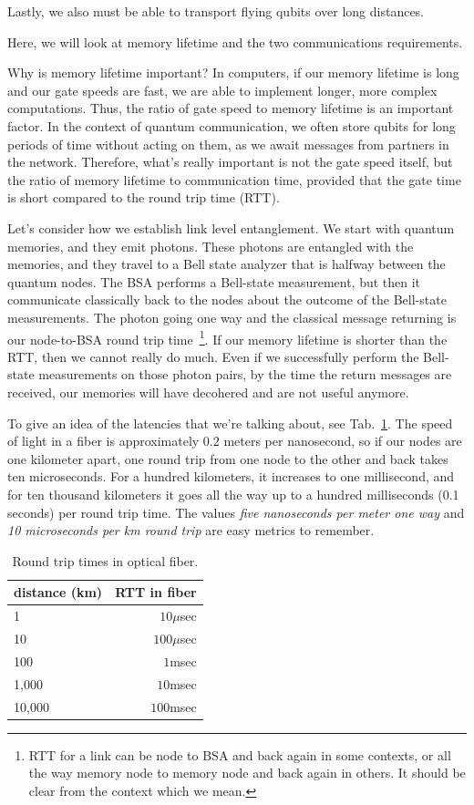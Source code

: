Lastly, we also must be able to transport flying qubits over long distances.

Here, we will look at memory lifetime and the two communications requirements.

Why is memory lifetime important? In computers, if our memory lifetime is long and our gate speeds are fast, we are able to implement longer, more complex computations.  Thus, the ratio of gate speed to memory lifetime is an important factor. In the context of quantum communication, we often store qubits for long periods of time without acting on them, as we await messages from partners in the network.  Therefore, what's really important is not the gate speed itself, but the ratio of memory lifetime to communication time, 
provided that the gate time is short compared to the round trip time (RTT). 

Let's consider how we establish link level entanglement. We start with quantum memories, and they emit photons. These photons are entangled with the memories, and they travel to a Bell state analyzer that is halfway between the quantum nodes. The BSA performs a Bell-state measurement, but then it communicate classically back to the nodes about the outcome of the Bell-state measurements. The photon going one way and the classical message returning is our node-to-BSA round trip time~\footnote{RTT for a link can be node to BSA and back again in some contexts, or all the way memory node to memory node and back again in others. It should be clear from the context which we mean.}. If our memory lifetime is shorter than the RTT, then we cannot really do much. Even if we successfully perform the Bell-state measurements on those photon pairs, by the time the return messages are received, our memories will have decohered and are not useful anymore.

To give an idea of the latencies that we're talking about, see Tab.~\ref{tab:rtt}. The speed of light in a fiber is approximately $0.2$ meters per nanosecond,
so if our nodes are one kilometer apart, one round trip from one node to the other and back takes ten microseconds. For a hundred kilometers, it increases to one millisecond, and for ten thousand kilometers it goes all the way up to a hundred milliseconds (0.1 seconds) per round trip time.  The values \emph{five nanoseconds per meter one way} and \emph{10 microseconds per km round trip} are easy metrics to remember.

\begin{table}
\centering
\begin{tabular}{l|r}
distance (km)  & RTT in fiber \\\hline
1     & $10\mu$sec \\
10    & $100\mu$sec \\
100   & $1$msec \\
1,000 & $10$msec \\
10,000 & $100$msec
\end{tabular}
\caption{Round trip times in optical fiber.}
\label{tab:rtt}
\end{table}


